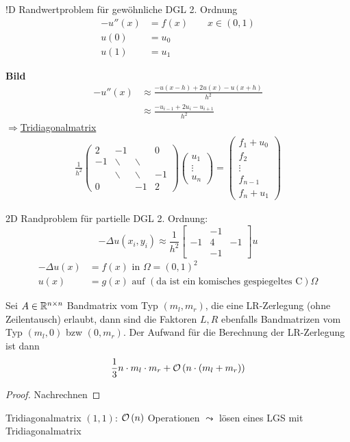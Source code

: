 \documentclass[../Skript.tex]{subfiles}
\begin{document}
!D Randwertproblem für gewöhnliche DGL 2. Ordnung 
\begin{align*}
    -u''(x)&= f(x)\qquad x\in(0,1)\\
    u(0)&= u_0\\
    u(1) &= u_1
\end{align*}

\textbf{Bild}
\begin{align*}
    -u''(x)&\approx \frac{-u(x-h)+2u(x)-u(x+h)}{h^2}\\
    &\approx \frac{-u_{i-1}+2u_i-u_{i+1}}{h^2}
\end{align*}
\(\Rightarrow \)\underline{Tridiagonalmatrix}
\begin{align*}
    \frac{1}{h^2}\begin{pmatrix}
        2 & -1 & \ & 0 \\
        -1 & \smallsetminus & \smallsetminus & \ \\
        \ & \smallsetminus & \smallsetminus & -1 \\
        0 & \ & -1 & 2
    \end{pmatrix}\begin{pmatrix}
        u_1 \\
        \vdots \\
        u_n
    \end{pmatrix}=\begin{pmatrix}
        f_1+u_0 \\
        f_2 \\
        \vdots \\
        f_{n-1} \\
        f_n+u_1
    \end{pmatrix}   
\end{align*}

2D Randproblem für partielle DGL 2. Ordnung:
\[
-\Delta u(x_i,y_i)\approx\frac{1}{h^2}\begin{bmatrix}
    \ & -1 & \ \\
    -1 & 4 & -1 \\
    \ & -1 & \ 
\end{bmatrix}u
\]
\begin{align*}
    -\Delta u(x)&=f(x) \text{ in } \Omega = (0,1)^2\\
    u(x)&= g(x)\text{ auf }(\text{da ist ein komisches gespiegeltes 
    C})\Omega
\end{align*}



\begin{theorem}
    Sei $A\in \mathbb{R}^{n\times n}$ Bandmatrix vom Typ $(m_l, m_r)$, die eine 
    LR-Zerlegung (ohne Zeilentausch) erlaubt, dann sind die Faktoren 
    $L,R$ ebenfalls Bandmatrizen vom Typ $(m_l, 0)$ bzw $(0,m_r)$. Der 
    Aufwand für die Berechnung der LR-Zerlegung ist dann \[
    \frac{1}{3}n\cdot m_l \cdot m_r + \calO{n\cdot(m_l + m_r)}
    \]
\end{theorem}
\begin{proof}
    Nachrechnen 
\end{proof}
\begin{example}
    Tridiagonalmatrix $(1,1)$: $\calO{n}$ Operationen $\leadsto$ lösen 
    eines LGS mit Tridiagonalmatrix
\end{example}
\end{document}
